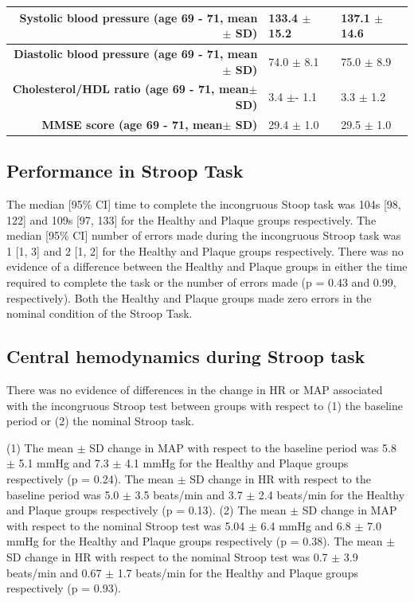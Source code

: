 \documentclass[12pt]{spieman}  %
\begin{document}
\begin{spacing}{2}
\begin{table}[]
\begin{center}
\begin{tabular}{r|l|l|}
\multicolumn{1}{|r|}{\textbf{Systolic blood pressure (age 69 - 71, mean $\pm$ SD)}} & 133.4 $\pm$ 15.2                                 & 137.1 $\pm$ 14.6                                \\ \hline
\multicolumn{1}{|r|}{\textbf{Diastolic blood pressure (age 69 - 71, mean $\pm$ SD)}} & 74.0 $\pm$ 8.1                                 & 75.0 $\pm$ 8.9                                \\ \hline
\multicolumn{1}{|r|}{\textbf{Cholesterol/HDL ratio (age 69 - 71, mean$\pm$ SD)}}   & 3.4 $\pm$- 1.1                                    & 3.3 $\pm$ 1.2                                   \\ \hline
\multicolumn{1}{|r|}{\textbf{MMSE score (age 69 - 71, mean$\pm$ SD)}}   & 29.4 $\pm$ 1.0                                    & 29.5 $\pm$ 1.0                                   \\ \hline
\end{tabular}
\label{table:participantCharacteristics}
\end{center}
\end{table}

\subsection{Performance in Stroop Task}
The median [95\% CI] time to complete the incongruous Stoop task was 104s [98, 122] and 109s [97, 133] for the Healthy and Plaque groups respectively. The median [95\% CI] number of errors made during the incongruous Stroop task was 1 [1, 3] and 2 [1, 2] for the Healthy and Plaque groups respectively. There was no evidence of a difference between the Healthy and Plaque groups in either the time required to complete the task or the number of errors made (p = 0.43 and 0.99, respectively). Both the Healthy and Plaque groups made zero errors in the nominal condition of the Stroop Task.


\subsection{Central hemodynamics during Stroop task}
 There was no evidence of differences in the change in HR or  MAP associated with the incongruous Stroop test between groups with respect to (1) the baseline period or (2) the nominal Stroop task. 
 
\noindent (1) The mean $\pm$ SD change in MAP with respect to the baseline period was 5.8 $\pm$ 5.1 mmHg and 7.3 $\pm$ 4.1 mmHg for the Healthy and Plaque groups respectively (p = 0.24). The mean $\pm$ SD change in HR with respect to the baseline period was 5.0 $\pm$ 3.5 beats/min and 3.7 $\pm$ 2.4 beats/min for the Healthy and Plaque groups respectively (p = 0.13). 
 \newline
 \noindent (2) The mean $\pm$ SD change in MAP with respect to the nominal Stroop test was 5.04 $\pm$ 6.4 mmHg and 6.8 $\pm$ 7.0 mmHg for the Healthy and Plaque groups respectively (p = 0.38). The mean $\pm$ SD change in HR with respect to the nominal Stroop test was 0.7 $\pm$ 3.9 beats/min and 0.67 $\pm$ 1.7 beats/min for the Healthy and Plaque groups respectively (p = 0.93).  


\end{spacing}
\end{document}
